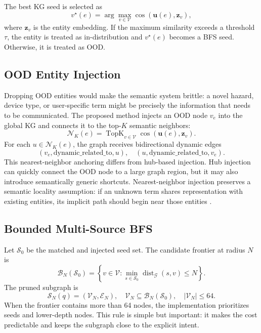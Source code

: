 \documentclass[journal]{IEEEtran}
\newcommand{\KG}{\mathcal{G}}
\newcommand{\SG}{\mathcal{S}}
\newcommand{\calE}{\mathcal{E}}
\newcommand{\calN}{\mathcal{N}}
\newcommand{\calS}{\mathcal{S}}
\newcommand{\calV}{\mathcal{V}}
\begin{document}
The best KG seed is selected as
\begin{equation}
v^\star(e)=
\arg\max_{v\in\calV}
\cos\left(\mathbf{u}(e),\mathbf{z}_v\right),
\label{eq:seed_match}
\end{equation}
where $\mathbf{z}_v$ is the entity embedding. If the maximum similarity exceeds a threshold $\tau$, the entity is treated as in-distribution and $v^\star(e)$ becomes a BFS seed. Otherwise, it is treated as OOD.

\subsection{OOD Entity Injection}

Dropping OOD entities would make the semantic system brittle: a novel hazard, device type, or user-specific term might be precisely the information that needs to be communicated. The proposed method injects an OOD node $v_e$ into the global KG and connects it to the top-$K$ semantic neighbors:
\begin{equation}
\calN_K(e)=
\operatorname{TopK}_{v\in\calV}
\cos(\mathbf{u}(e),\mathbf{z}_v).
\label{eq:topk}
\end{equation}
For each $u\in\calN_K(e)$, the graph receives bidirectional dynamic edges
\begin{equation}
(v_e,\mathrm{dynamic\_related\_to},u),\quad
(u,\mathrm{dynamic\_related\_to},v_e).
\end{equation}
This nearest-neighbor anchoring differs from hub-based injection. Hub injection can quickly connect the OOD node to a large graph region, but it may also introduce semantically generic shortcuts. Nearest-neighbor injection preserves a semantic locality assumption: if an unknown term shares representation with existing entities, its implicit path should begin near those entities \cite{fang2026cross,liao2026hypergraph}.

\subsection{Bounded Multi-Source BFS}

Let $\calS_0$ be the matched and injected seed set. The candidate frontier at radius $N$ is
\begin{equation}
\mathcal{B}_N(\calS_0)=
\left\{v\in\calV:
\min_{s\in\calS_0}\operatorname{dist}_{\KG}(s,v)\leq N
\right\}.
\end{equation}
The pruned subgraph is
\begin{equation}
\SG_N(q)=\left(\calV_N,\calE_N\right),\quad
\calV_N\subseteq \mathcal{B}_N(\calS_0),\quad
|\calV_N|\leq 64.
\label{eq:subgraph}
\end{equation}
When the frontier contains more than 64 nodes, the implementation prioritizes seeds and lower-depth nodes. This rule is simple but important: it makes the cost predictable and keeps the subgraph close to the explicit intent.
\end{document}
